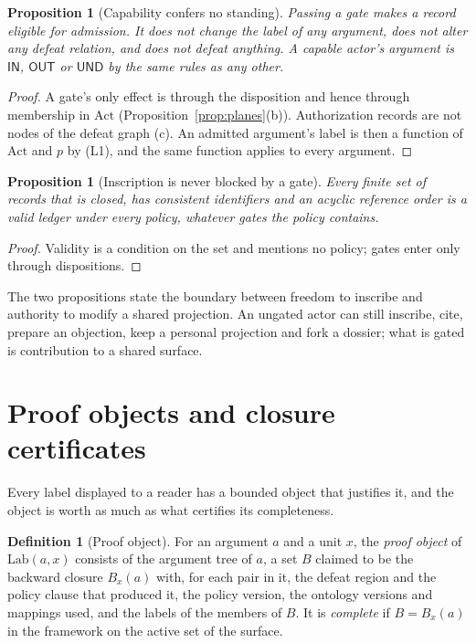 \documentclass[11pt]{article}
\theoremstyle{plain}
\newtheorem{proposition}[theorem]{Proposition}
\theoremstyle{definition}
\newtheorem{definition}[theorem]{Definition}
\theoremstyle{remark}
\newcommand{\IN}{\textsf{IN}}
\newcommand{\OUT}{\textsf{OUT}}
\newcommand{\UND}{\textsf{UND}}
\newcommand{\Lab}{\mathrm{Lab}}
\newcommand{\Act}{\mathrm{Act}}
\begin{document}
\begin{proposition}[Capability confers no standing]\label{prop:capnostanding}
Passing a gate makes a record eligible for admission. It does not change the label of any argument, does not alter any defeat relation, and does not defeat anything. A capable actor's argument is $\IN$, $\OUT$ or $\UND$ by the same rules as any other.
\end{proposition}

\begin{proof}
A gate's only effect is through the disposition and hence through membership in $\Act$ (Proposition~\ref{prop:planes}(b)). Authorization records are not nodes of the defeat graph (c). An admitted argument's label is then a function of $\Act$ and $p$ by (L1), and the same function applies to every argument.
\end{proof}

\begin{proposition}[Inscription is never blocked by a gate]\label{prop:openinscription}
Every finite set of records that is closed, has consistent identifiers and an acyclic reference order is a valid ledger under every policy, whatever gates the policy contains.
\end{proposition}

\begin{proof}
Validity is a condition on the set and mentions no policy; gates enter only through dispositions.
\end{proof}

The two propositions state the boundary between freedom to inscribe and authority to modify a shared projection. An ungated actor can still inscribe, cite, prepare an objection, keep a personal projection and fork a dossier; what is gated is contribution to a shared surface.

\section{Proof objects and closure certificates}\label{sec:certs}

Every label displayed to a reader has a bounded object that justifies it, and the object is worth as much as what certifies its completeness.

\begin{definition}[Proof object]\label{def:proofobject}
For an argument $a$ and a unit $x$, the \emph{proof object} of $\Lab(a,x)$ consists of the argument tree of $a$, a set $B$ claimed to be the backward closure $B_x(a)$ with, for each pair in it, the defeat region and the policy clause that produced it, the policy version, the ontology versions and mappings used, and the labels of the members of $B$. It is \emph{complete} if $B=B_x(a)$ in the framework on the active set of the surface.
\end{definition}
\end{document}
